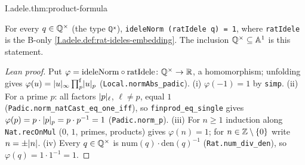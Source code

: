 \begin{theorem}
\end{theorem}
\begin{tfformal}{I.adele.thm:product-formula}
\begin{tffidelity}
For every $q\in\mathbb{Q}^\times$ (the type \texttt{ℚˣ}), \texttt{ideleNorm (ratIdele q) = 1}, where \texttt{ratIdele} is the B-only \cref{I.adele.def:rat-ideles-embedding}. The inclusion $\mathbb{Q}^\times\subseteq\mathbb{A}^1$ is this statement.
\end{tffidelity}
\end{tfformal}
\begin{proof}[Lean proof]
Put $\varphi=\mathrm{ideleNorm}\circ\mathrm{ratIdele}\colon\mathbb{Q}^\times\to\mathbb{R}$, a homomorphism; unfolding gives $\varphi(u)=\lvert u\rvert_\infty\prod^{\mathrm f}_p\lvert u\rvert_p$ (\texttt{Local.normAbs\_padic}). (i) $\varphi(-1)=1$ by \texttt{simp}. (ii) For a prime $p$: all factors $\lvert p\rvert_\ell$, $\ell\ne p$, equal $1$ (\texttt{Padic.norm\_natCast\_eq\_one\_iff}), so \texttt{finprod\_eq\_single} gives $\varphi(p)=p\cdot\lvert p\rvert_p=p\cdot p^{-1}=1$ (\texttt{Padic.norm\_p}). (iii) For $n\ge1$ induction along \texttt{Nat.recOnMul} ($0$, $1$, primes, products) gives $\varphi(n)=1$; for $n\in\mathbb{Z}\setminus\{0\}$ write $n=\pm\lvert n\rvert$. (iv) Every $q\in\mathbb{Q}^\times$ is $\mathrm{num}(q)\cdot\mathrm{den}(q)^{-1}$ (\texttt{Rat.num\_div\_den}), so $\varphi(q)=1\cdot1^{-1}=1$.
\end{proof}

